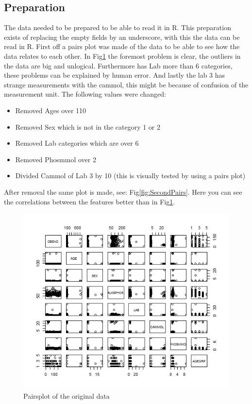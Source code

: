 \documentclass{article}
\begin{document}
    \subsection{Preparation}
      The data needed to be prepared to be able to read it in R.
      This preparation exists of replacing the empty fields by an underscore, with this the data can be read in R.
      First off a pairs plot was made of the data to be able to see how the data relates to each other.
      In Fig\ref{fig:FirstPairs} the foremost problem is clear, the outliers in the data are big and unlogical.
      Furthermore has Lab more than 6 categories, these problems can be explained by human error.
      And lastly the lab 3 has strange measurements with the cammol, this might be because of confusion of the measurement unit.
      The following values were changed:
      \begin{itemize}
        \item Removed Ages over 110
        \item Removed Sex which is not in the category 1 or 2
        \item Removed Lab categories which are over 6
        \item Removed Phosmmol over 2
        \item Divided Cammol of Lab 3 by 10 (this is visually tested by using a pairs plot)
      \end{itemize}
      After removal the same plot is made, see: Fig\ref{fig:SecondPairs}.
      Here you can see the correlations between the features better than in Fig\ref{fig:FirstPairs}.
      \begin{figure}[H]
          \centering
          \includegraphics[scale=0.5]{../results/FirstPairs.png}
          \caption{Pairsplot of the original data}
          \label{fig:FirstPairs}
      \end{figure}
\end{document}
